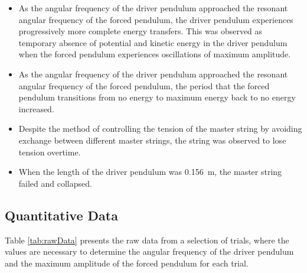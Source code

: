 \documentclass[letterpaper, 12pt]{article}
\begin{document}
\begin{itemize}
    \item As the angular frequency of the driver pendulum approached the resonant angular frequency of the forced pendulum, the driver pendulum experiences progressively more complete energy transfers. This was observed as temporary absence of potential and kinetic energy in the driver pendulum when the forced pendulum experiences oscillations of maximum amplitude.
    \item As the angular frequency of the driver pendulum approached the resonant angular frequency of the forced pendulum, the period that the forced pendulum transitions from no energy to maximum energy back to no energy increased.
    \item Despite the method of controlling the tension of the master string by avoiding exchange between different master strings, the string was observed to lose tension overtime.
    \item When the length of the driver pendulum was \SI{0.156}{m}, the master string failed and collapsed.
\end{itemize}

\subsection{Quantitative Data}

Table \ref*{tab:rawData} presents the raw data from a selection of
trials, where the values are necessary to determine the angular frequency
of the driver pendulum and the maximum amplitude of the forced
pendulum for each trial.

\end{document}
